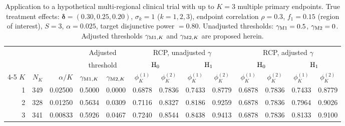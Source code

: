 \begin{table}[ht]
\centering
\footnotesize
\caption{Application to a hypothetical multi-regional clinical trial with up to $K = 3$ multiple primary endpoints. True treatment effects: $\boldsymbol{\delta} = (0.30, 0.25, 0.20)$, $\sigma_{k} = 1$ ($k = 1, 2, 3$), endpoint correlation $\rho = 0.3$, $f_{1} = 0.15$ (region of interest), $S = 3$, $\alpha = 0.025$, target disjunctive power $= 0.80$. Unadjusted thresholds: $\gamma_{{\rm M}1} = 0.5$, $\gamma_{{\rm M}2} = 0$. Adjusted thresholds $\gamma_{{\rm M}1,K}$ and $\gamma_{{\rm M}2,K}$ are proposed herein.}
\label{tab:application}
\begin{tabular}{r r r cc cccc cccc}
\hline
 & & & \multicolumn{2}{c}{Adjusted} & \multicolumn{4}{c}{RCP, unadjusted $\gamma$} & \multicolumn{4}{c}{RCP, adjusted $\gamma$} \\
 & & & \multicolumn{2}{c}{threshold} & \multicolumn{2}{c}{${\rm H}_{0}$} & \multicolumn{2}{c}{${\rm H}_{1}$} & \multicolumn{2}{c}{${\rm H}_{0}$} & \multicolumn{2}{c}{${\rm H}_{1}$} \\
\cline{4-5}\cline{6-7}\cline{8-9}\cline{10-11}\cline{12-13}
$K$ & $N_{K}$ & $\alpha/K$ & $\gamma_{{\rm M}1,K}$ & $\gamma_{{\rm M}2,K}$ & $\phi^{(1)}_{K}$ & $\phi^{(2)}_{K}$ & $\phi^{(1)}_{K}$ & $\phi^{(2)}_{K}$ & $\phi^{(1)}_{K}$ & $\phi^{(2)}_{K}$ & $\phi^{(1)}_{K}$ & $\phi^{(2)}_{K}$ \\
\hline
1 & 349 & 0.02500 & 0.5000 & 0.0000 & 0.6878 & 0.7836 & 0.7433 & 0.8779 & 0.6878 & 0.7836 & 0.7433 & 0.8779 \\
2 & 328 & 0.01250 & 0.5634 & 0.0309 & 0.7116 & 0.8327 & 0.8186 & 0.9259 & 0.6878 & 0.7836 & 0.7964 & 0.9026 \\
3 & 341 & 0.00833 & 0.5926 & 0.0467 & 0.7240 & 0.8544 & 0.8438 & 0.9413 & 0.6878 & 0.7836 & 0.8133 & 0.9100 \\
\hline
\end{tabular}
\end{table}
